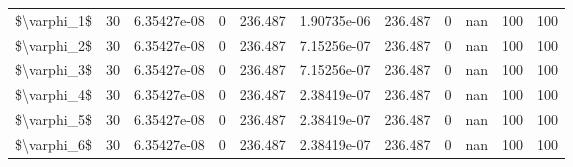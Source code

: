 \begin{tabular}{lrrrrrrrrrr}
 \$\textbackslash{}varphi\_1\$ &  30 & 6.35427e-08 & 0        &    236.487  &    1.90735e-06 &     236.487  &     0        &         nan & 100           & 100           \\
 \$\textbackslash{}varphi\_2\$ &  30 & 6.35427e-08 & 0        &    236.487  &    7.15256e-07 &     236.487  &     0        &         nan & 100           & 100           \\
 \$\textbackslash{}varphi\_3\$ &  30 & 6.35427e-08 & 0        &    236.487  &    7.15256e-07 &     236.487  &     0        &         nan & 100           & 100           \\
 \$\textbackslash{}varphi\_4\$ &  30 & 6.35427e-08 & 0        &    236.487  &    2.38419e-07 &     236.487  &     0        &         nan & 100           & 100           \\
 \$\textbackslash{}varphi\_5\$ &  30 & 6.35427e-08 & 0        &    236.487  &    2.38419e-07 &     236.487  &     0        &         nan & 100           & 100           \\
 \$\textbackslash{}varphi\_6\$ &  30 & 6.35427e-08 & 0        &    236.487  &    2.38419e-07 &     236.487  &     0        &         nan & 100           & 100           \\
\hline
\end{tabular}
